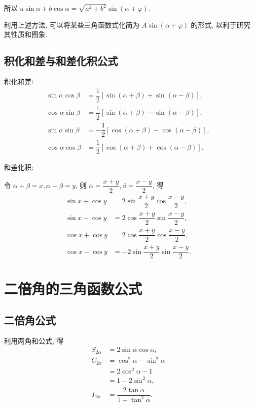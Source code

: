 \documentclass[titlepage]{ctexart}
\begin{document}
所以 $a\sin \alpha + b\cos \alpha = \sqrt{a^2 + b^2}\sin(\alpha + \varphi).$

利用上述方法, 可以将某些三角函数式化简为 $A\sin(\alpha + \varphi)$ 的形式, 以利于研究其性质和图象.

\subsection{积化和差与和差化积公式}

积化和差:
\begin{align*}
    \sin \alpha \cos \beta &= \dfrac{1}{2}[\sin(\alpha + \beta) + \sin(\alpha - \beta)], \\
    \cos \alpha \sin \beta &= \dfrac{1}{2}[\sin(\alpha + \beta) - \sin(\alpha - \beta)], \\
    \sin \alpha \sin \beta &= -\dfrac{1}{2}[\cos(\alpha + \beta) - \cos(\alpha - \beta)], \\
    \cos \alpha \cos \beta &= \dfrac{1}{2}[\cos(\alpha + \beta) + \cos(\alpha - \beta)].
\end{align*}

和差化积:

令 $\alpha + \beta = x, \alpha - \beta = y$, 则 $\alpha = \dfrac{x + y}{2}, \beta = \dfrac{x - y}{2}$, 得
\begin{align*}
    \sin x + \cos y &= 2\sin \dfrac{x + y}{2} \cos \dfrac{x - y}{2}, \\
    \sin x - \cos y &= 2\cos \dfrac{x + y}{2} \sin \dfrac{x - y}{2}, \\
    \cos x + \cos y &= 2\cos \dfrac{x + y}{2} \cos \dfrac{x - y}{2}, \\
    \cos x - \cos y &= -2\sin \dfrac{x + y}{2} \sin \dfrac{x - y}{2}.
\end{align*}


\section{二倍角的三角函数公式}

\subsection{二倍角公式}

利用两角和公式, 得
\begin{align*}
    S_{2\alpha} &= 2\sin \alpha \cos \alpha, \\
    C_{2\alpha} &= \cos^2 \alpha - \sin^2 \alpha \\
                &= 2\cos^2 \alpha - 1 \\
                &= 1 - 2\sin^2 \alpha, \\
    T_{2\alpha} &= \dfrac{2\tan \alpha}{1 - \tan^2 \alpha}.
\end{align*}
\end{document}
